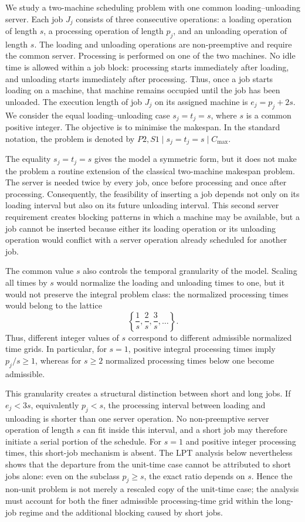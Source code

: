 \documentclass[11pt]{article}
\begin{document}
We study a two-machine scheduling problem with one common loading--unloading
server. Each job \(J_j\) consists of three consecutive operations: a loading
operation of length \(s\), a processing operation of length \(p_j\), and an
unloading operation of length \(s\). The loading and unloading operations are
non-preemptive and require the common server. Processing is performed on one of
the two machines. No idle time is allowed within a job block: processing starts
immediately after loading, and unloading starts immediately after processing.
Thus, once a job starts loading on a machine, that machine remains occupied until
the job has been unloaded. The execution length of job \(J_j\) on its assigned
machine is \(e_j=p_j+2s\).
We consider the equal loading--unloading case \(s_j=t_j=s\), where \(s\) is a common positive integer. The objective is to minimise the
makespan. In the standard notation, the problem is denoted by \(P2,S1\mid s_j=t_j=s\mid C_{\max}\).

The equality \(s_j=t_j=s\) gives the model a symmetric form, but it does not make
the problem a routine extension of the classical two-machine makespan problem.
The server is needed twice by every job, once before processing and once after
processing. Consequently, the feasibility of inserting a job depends not only on
its loading interval but also on its future unloading interval. This second server
requirement creates blocking patterns in which a machine may be available, but a
job cannot be inserted because either its loading operation or its unloading
operation would conflict with a server operation already scheduled for another
job.

The common value \(s\) also controls the temporal granularity of the model.
Scaling all times by \(s\) would normalize the loading and unloading times to one,
but it would not preserve the integral problem class: the normalized processing
times would belong to the lattice
\[
\left\{\frac{1}{s},\frac{2}{s},\frac{3}{s},\ldots\right\}.
\]
Thus, different integer values of \(s\) correspond to different admissible normalized
time grids. In particular, for \(s=1\), positive integral processing times imply
\(p_j/s\ge1\), whereas for \(s\ge2\) normalized processing times below one become
admissible.

This granularity creates a structural distinction between short and long jobs. If
\(e_j<3s\), equivalently \(p_j<s\), the processing interval between loading and
unloading is shorter than one server operation. No non-preemptive server operation
of length \(s\) can fit inside this interval, and a short job may therefore initiate
a serial portion of the schedule. For \(s=1\) and positive integer processing
times, this short-job mechanism is absent. The LPT analysis below nevertheless
shows that the departure from the unit-time case cannot be attributed to short jobs
alone: even on the subclass \(p_j\ge s\), the exact ratio depends on \(s\). Hence
the non-unit problem is not merely a rescaled copy of the unit-time case; the
analysis must account for both the finer admissible processing-time grid within the
long-job regime and the additional blocking caused by short jobs.
\end{document}
